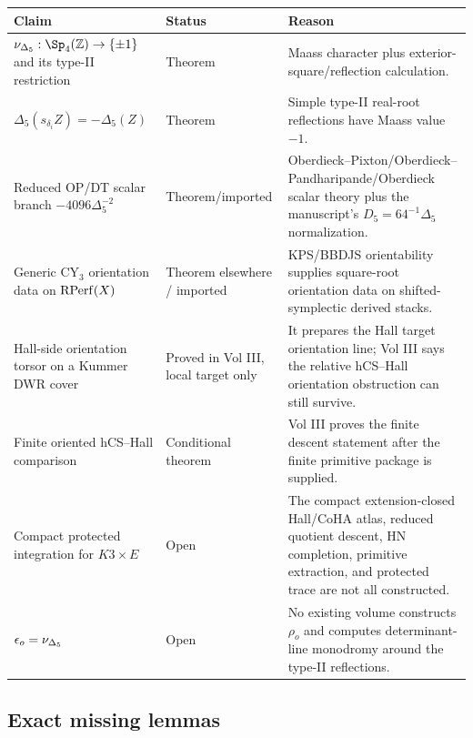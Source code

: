 \begin{center}
\small
\begin{tabular}{p{}p{}p{}}
\hline
Claim & Status & Reason \\
\hline
\(\nuDelta:\Sp_4(\Z)\to\{\pm1\}\) and its type-II restriction &
Theorem &
Maass character plus exterior-square/reflection calculation. \\
\(\Delta_5(s_{\delta_i}Z)=-\Delta_5(Z)\) &
Theorem &
Simple type-II real-root reflections have Maass value \(-1\). \\
Reduced OP/DT scalar branch
\(-4096\Delta_5^{-2}\) &
Theorem/imported &
Oberdieck--Pixton/Oberdieck--Pandharipande/Oberdieck scalar theory plus
the manuscript's \(D_5=64^{-1}\Delta_5\) normalization. \\
Generic CY\(_3\) orientation data on \(\operatorname{RPerf}(X)\) &
Theorem elsewhere / imported &
KPS/BBDJS orientability supplies square-root orientation data on
shifted-symplectic derived stacks. \\
Hall-side orientation torsor on a Kummer DWR cover &
Proved in Vol III, local target only &
It prepares the Hall target orientation line; Vol III says the relative
hCS--Hall orientation obstruction can still survive. \\
Finite oriented hCS--Hall comparison &
Conditional theorem &
Vol III proves the finite descent statement after the finite primitive
package is supplied. \\
Compact protected integration for \(K3\times E\) &
Open &
The compact extension-closed Hall/CoHA atlas, reduced quotient descent,
HN completion, primitive extraction, and protected trace are not all
constructed. \\
\(\epsilon_o=\nu_{\Delta_5}\) &
Open &
No existing volume constructs \(\rho_o\) and computes determinant-line
monodromy around the type-II reflections. \\
\hline
\end{tabular}
\end{center}

\subsection{Exact missing lemmas}

